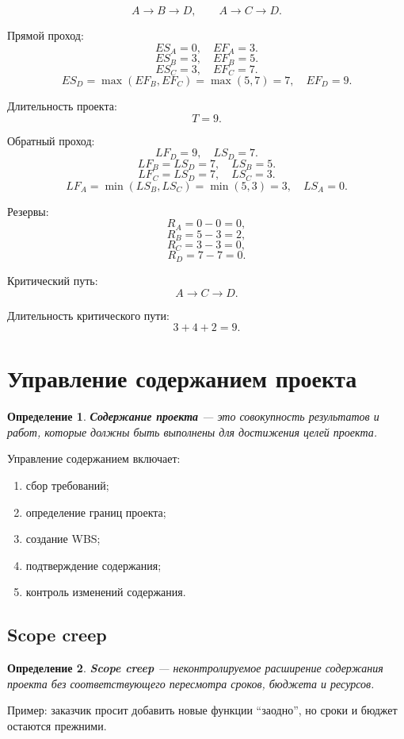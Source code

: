 \documentclass[12pt,a4paper]{article}
\newtheorem{definition}{Определение}
\begin{document}
\[
A \rightarrow B \rightarrow D,
\qquad
A \rightarrow C \rightarrow D.
\]

Прямой проход:
\[
ES_A=0,\quad EF_A=3.
\]
\[
ES_B=3,\quad EF_B=5.
\]
\[
ES_C=3,\quad EF_C=7.
\]
\[
ES_D=\max(EF_B,EF_C)=\max(5,7)=7,\quad EF_D=9.
\]

Длительность проекта:
\[
T=9.
\]

Обратный проход:
\[
LF_D=9,\quad LS_D=7.
\]
\[
LF_B=LS_D=7,\quad LS_B=5.
\]
\[
LF_C=LS_D=7,\quad LS_C=3.
\]
\[
LF_A=\min(LS_B,LS_C)=\min(5,3)=3,\quad LS_A=0.
\]

Резервы:
\[
R_A=0-0=0,
\]
\[
R_B=5-3=2,
\]
\[
R_C=3-3=0,
\]
\[
R_D=7-7=0.
\]

Критический путь:
\[
A \rightarrow C \rightarrow D.
\]

Длительность критического пути:
\[
3+4+2=9.
\]

\section{Управление содержанием проекта}

\begin{definition}
\textbf{Содержание проекта} --- это совокупность результатов и работ, которые должны быть выполнены для достижения целей проекта.
\end{definition}

Управление содержанием включает:
\begin{enumerate}
    \item сбор требований;
    \item определение границ проекта;
    \item создание WBS;
    \item подтверждение содержания;
    \item контроль изменений содержания.
\end{enumerate}

\subsection{Scope creep}

\begin{definition}
\textbf{Scope creep} --- неконтролируемое расширение содержания проекта без соответствующего пересмотра сроков, бюджета и ресурсов.
\end{definition}

Пример: заказчик просит добавить новые функции ``заодно'', но сроки и бюджет остаются прежними.
\end{document}
